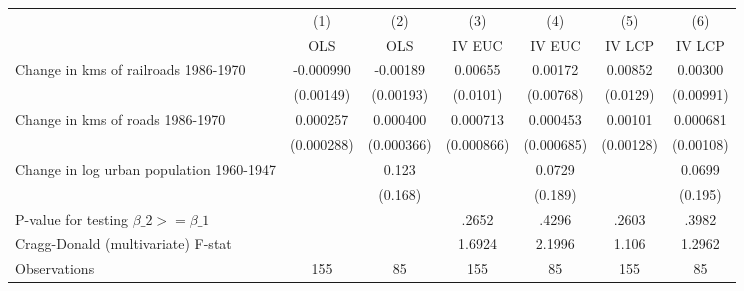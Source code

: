 {
\def\sym#1{\ifmmode^{#1}\else\(^{#1}\)\fi}
\begin{tabular}{l*{6}{c}}
\hline\hline
                &\multicolumn{1}{c}{(1)}&\multicolumn{1}{c}{(2)}&\multicolumn{1}{c}{(3)}&\multicolumn{1}{c}{(4)}&\multicolumn{1}{c}{(5)}&\multicolumn{1}{c}{(6)}\\
                &\multicolumn{1}{c}{OLS}&\multicolumn{1}{c}{OLS}&\multicolumn{1}{c}{IV EUC}&\multicolumn{1}{c}{IV EUC}&\multicolumn{1}{c}{IV LCP}&\multicolumn{1}{c}{IV LCP}\\
\hline
Change in kms of railroads 1986-1970&-0.000990         & -0.00189         &  0.00655         &  0.00172         &  0.00852         &  0.00300         \\
                &(0.00149)         &(0.00193)         & (0.0101)         &(0.00768)         & (0.0129)         &(0.00991)         \\
[1em]
Change in kms of roads 1986-1970& 0.000257         & 0.000400         & 0.000713         & 0.000453         &  0.00101         & 0.000681         \\
                &(0.000288)         &(0.000366)         &(0.000866)         &(0.000685)         &(0.00128)         &(0.00108)         \\
[1em]
Change in log urban population 1960-1947&                  &    0.123         &                  &   0.0729         &                  &   0.0699         \\
                &                  &  (0.168)         &                  &  (0.189)         &                  &  (0.195)         \\
\hline
P-value for testing $\beta\_{2} >= \beta\_{1}$&                  &                  &    .2652         &    .4296         &    .2603         &    .3982         \\
Cragg-Donald (multivariate) F-stat&                  &                  &   1.6924         &   2.1996         &    1.106         &   1.2962         \\
Observations    &      155         &       85         &      155         &       85         &      155         &       85         \\
\hline\hline
\end{tabular}
}
